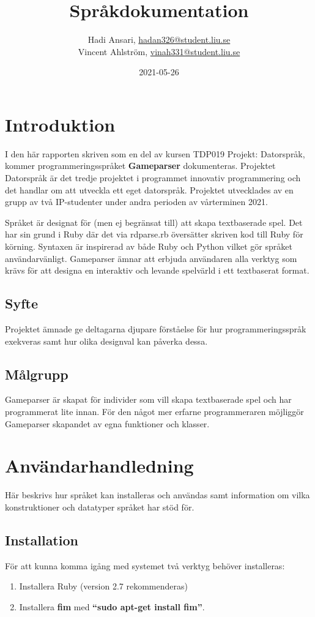 \documentclass{Dokumentmall}
\author{Hadi Ansari, \url{hadan326@student.liu.se}\\
  Vincent Ahlström, \url{vinah331@student.liu.se}}
\title{Språkdokumentation}
\date{2021-05-26}
\begin{document}
\projectpage
\tableofcontents
\thispagestyle{empty}
\cleardoublepage
\setcounter{page}{1}
\section{Introduktion}
I den här rapporten skriven som en del av kursen TDP019 Projekt: Datorspråk, kommer programmeringsspråket \textbf{Gameparser} dokumenteras. Projektet Datorspråk är det tredje projektet i programmet innovativ programmering och det handlar om att utveckla ett eget datorspråk. Projektet utvecklades av en grupp av två IP-studenter under andra perioden av vårterminen 2021.

Språket är designat för (men ej begränsat till) att skapa textbaserade spel. Det har sin grund i Ruby där det via rdparse.rb översätter skriven kod till Ruby för körning. Syntaxen är inspirerad av både Ruby och Python vilket gör språket användarvänligt. Gameparser ämnar att erbjuda användaren alla verktyg som krävs för att designa en interaktiv och levande spelvärld i ett textbaserat format.

\subsection{Syfte}
Projektet ämnade ge deltagarna djupare förståelse för hur programmeringsspråk exekveras samt hur olika designval kan påverka dessa.

\subsection{Målgrupp}
Gameparser är skapat för individer som vill skapa textbaserade spel och har programmerat lite innan. För den något mer erfarne programmeraren möjliggör Gameparser skapandet av egna funktioner och klasser.

\newpage
\section{Användarhandledning}
Här beskrivs hur språket kan installeras och användas samt information om vilka konstruktioner och  datatyper språket har stöd för.

\subsection{Installation}
För att kunna komma igång med systemet två verktyg behöver installeras:
\begin{enumerate}  
\item Installera Ruby (version 2.7 rekommenderas)
\item Installera \textbf{fim} med \textbf{``sudo apt-get install fim''}.
\end{enumerate}
\end{document}

